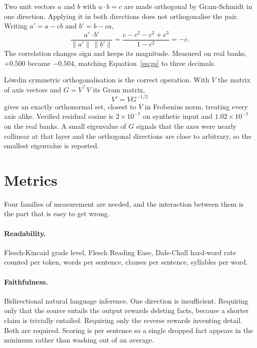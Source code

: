 \documentclass[twocolumn,10pt,a4paper]{article}
\begin{document}
Two unit vectors $a$ and $b$ with $a\cdot b = c$ are made orthogonal by
Gram-Schmidt in one direction. Applying it in both directions does not
orthogonalise the pair. Writing $a' = a - cb$ and $b' = b - ca$,
\begin{equation}
\frac{a'\cdot b'}{\lVert a'\rVert\,\lVert b'\rVert}
 = \frac{c - c^2 - c^2 + c^3}{1 - c^2} = -c .
\label{eq:gs}
\end{equation}
The correlation changes sign and keeps its magnitude. Measured on real banks,
$+0.500$ became $-0.504$, matching Equation~\ref{eq:gs} to three decimals.

L\"owdin symmetric orthogonalisation is the correct operation. With $V$ the
matrix of axis vectors and $G = V^\top V$ its Gram matrix,
\begin{equation}
V' = V G^{-1/2}
\label{eq:lowdin}
\end{equation}
gives an exactly orthonormal set, closest to $V$ in Frobenius norm, treating
every axis alike. Verified residual cosine is $2\times10^{-7}$ on synthetic input
and $1.02\times10^{-7}$ on the real banks. A small eigenvalue of $G$ signals that
the axes were nearly collinear at that layer and the orthogonal directions are
close to arbitrary, so the smallest eigenvalue is reported.

\section{Metrics}
\label{sec:metrics}

Four families of measurement are needed, and the interaction between them is the
part that is easy to get wrong.

\paragraph{Readability.} Flesch-Kincaid grade level, Flesch Reading Ease,
Dale-Chall hard-word rate counted per token, words per sentence, clauses per
sentence, syllables per word.

\paragraph{Faithfulness.} Bidirectional natural language inference. One
direction is insufficient. Requiring only that the source entails the output
rewards deleting facts, because a shorter claim is trivially entailed. Requiring
only the reverse rewards inventing detail. Both are required. Scoring is per
sentence so a single dropped fact appears in the minimum rather than washing out
of an average.
\end{document}
